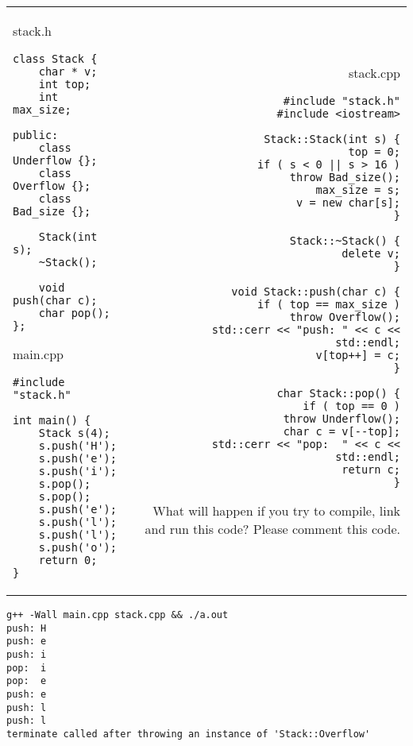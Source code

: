 \documentclass[landscape]{slides}
\begin{document}
\begin{slide}

\begin{tabular*}{\textwidth}{@{\extracolsep{\fill}}lr}

\begin{minipage}[t]{.32\linewidth}
\tiny{stack.h}
\begin{lstlisting}
class Stack {
    char * v;
    int top;
    int max_size;
    
public:
    class Underflow {};
    class Overflow {};
    class Bad_size {};
    
    Stack(int s);
    ~Stack();

    void push(char c);
    char pop();
};
\end{lstlisting}
\tiny{main.cpp}
\begin{lstlisting}
#include "stack.h"

int main() {
    Stack s(4);
    s.push('H');
    s.push('e');
    s.push('i');
    s.pop();
    s.pop();
    s.push('e');
    s.push('l');
    s.push('l');
    s.push('o');
    return 0;
}
\end{lstlisting}
\end{minipage}
&
\begin{minipage}[t]{.6\linewidth}
\tiny{stack.cpp}
\begin{lstlisting}
#include "stack.h"
#include <iostream>

Stack::Stack(int s) {
    top = 0;
    if ( s < 0 || s > 16 )
        throw Bad_size();
    max_size = s;
    v = new char[s];
}

Stack::~Stack() {
    delete v;
}

void Stack::push(char c) {
    if ( top == max_size )
        throw Overflow();
    std::cerr << "push: " << c << std::endl;
    v[top++] = c;
}

char Stack::pop() {
    if ( top == 0 )
        throw Underflow();
    char c = v[--top];
    std::cerr << "pop:  " << c << std::endl;
    return c;
}
\end{lstlisting}
What will happen if you try to compile, link and run this code?
Please comment this code. 
\end{minipage}

\end{tabular*}

\begin{note}
\begin{tiny}
\begin{verbatim}
g++ -Wall main.cpp stack.cpp && ./a.out
push: H
push: e
push: i
pop:  i
pop:  e
push: e
push: l
push: l
terminate called after throwing an instance of 'Stack::Overflow'
    

\end{verbatim}
\end{tiny}
\end{note}
\end{slide}
\end{document}
